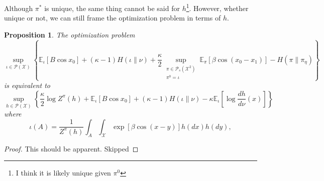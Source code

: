 \documentclass[12pt]{article}
\newtheorem{proposition}[theorem]{Proposition}
\numberwithin{equation}{section}
\begin{document}
Although $\pi^*$ is unique, the same thing cannot be said for $h$\footnote{I think it is likely unique given $\pi^0$}. However, whether unique or not, we can still frame the optimization problem in terms of $h$.

\begin{proposition}
    The optimization problem
    \begin{equation*}
        \sup_{\iota\in\mathcal{P}(\mathcal{X})}\left\{\mathbb{E}_{\iota}\left[B\cos x_0\right] + (\kappa-1)H(\iota \| \nu) +
        \frac\kappa2\sup_{\substack{\pi\in\mathcal{P}_s(\mathcal{X}^2)\\ \pi^0=\iota}}\mathbb{E}_{\pi}[\beta\cos(x_0-x_1)] - H(\pi\|\pi_\eta)\right\}
    \end{equation*}
    is equivalent to
    \begin{equation*}
        \sup_{h\in\mathcal{P}(\mathcal{X})}\left\{\frac\kappa2\log Z^\pi(h) + \mathbb{E}_{\iota}\left[B\cos x_0\right] + (\kappa-1)H(\iota \| \nu)
        - \kappa\mathbb{E}_{\iota}\left[\log\frac{dh}{d\nu}(x)\right]\right\}
    \end{equation*}
    where
    \begin{equation*}
        \iota(A) = \frac{1}{Z^\pi(h)}\int_A\int_\mathcal{X}\exp[\beta \cos(x - y)]h(dx)h(dy),
    \end{equation*}
\end{proposition}

\begin{proof}
    This should be apparent. Skipped
\end{proof}
\end{document}
